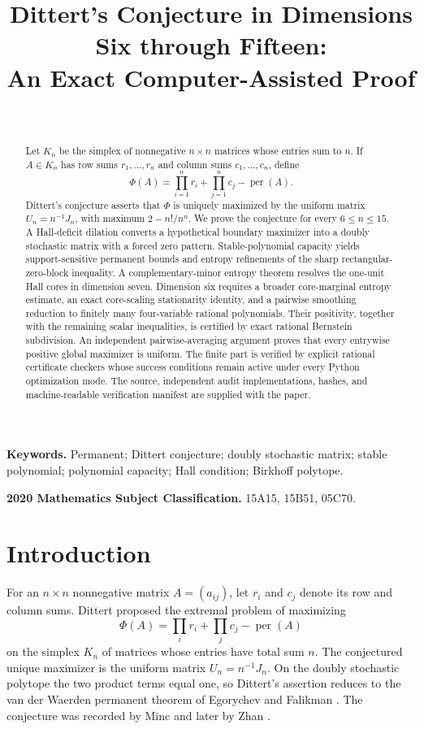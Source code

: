 \documentclass[11pt,a4paper]{article}
\title{Dittert's Conjecture in Dimensions Six through Fifteen:\\
An Exact Computer-Assisted Proof}
\author{\PaperAuthor\\[2pt]
\small\PaperORCID}
\date{\PaperVersion}
\numberwithin{equation}{section}
\theoremstyle{definition}
\newcommand{\per}{\operatorname{per}}
\newcommand{\1}{\mathbf{1}}
\begin{document}
\maketitle

\begin{abstract}
Let $K_n$ be the simplex of nonnegative $n\times n$ matrices whose entries
sum to $n$.  If $A\in K_n$ has row sums $r_1,\dots,r_n$ and column sums
$c_1,\dots,c_n$, define
\[
 \Phi(A)=\prod_{i=1}^n r_i+\prod_{j=1}^n c_j-\per(A).
\]
Dittert's conjecture asserts that $\Phi$ is uniquely maximized by the
uniform matrix $U_n=n^{-1}J_n$, with maximum $2-n!/n^n$.  We prove the
conjecture for every $6\le n\le15$.  A Hall-deficit dilation converts a
hypothetical boundary maximizer into a doubly stochastic matrix with a forced
zero pattern.  Stable-polynomial capacity yields support-sensitive permanent
bounds and entropy refinements of the sharp rectangular-zero-block
inequality.  A complementary-minor entropy theorem resolves the one-unit
Hall cores in dimension seven.  Dimension six requires a broader
core-marginal entropy estimate, an exact core-scaling stationarity identity,
and a pairwise smoothing reduction to finitely many four-variable rational
polynomials.  Their positivity, together with the remaining scalar
inequalities, is certified by exact rational Bernstein subdivision.  An
independent pairwise-averaging argument proves that every entrywise positive
global maximizer is uniform.  The finite part is verified by explicit rational certificate checkers whose
success conditions remain active under every Python optimization mode.  The
source, independent audit implementations, hashes, and machine-readable
verification manifest are supplied with the paper.
\end{abstract}

\noindent\textbf{Keywords.}
Permanent; Dittert conjecture; doubly stochastic matrix; stable polynomial; polynomial capacity; Hall condition; Birkhoff polytope.

\medskip
\noindent\textbf{2020 Mathematics Subject Classification.}
15A15, 15B51, 05C70.

\section{Introduction}

For an $n\times n$ nonnegative matrix $A=(a_{ij})$, let $r_i$ and $c_j$
denote its row and column sums.  Dittert proposed the extremal problem of
maximizing
\[
 \Phi(A)=\prod_i r_i+\prod_j c_j-\per(A)
\]
on the simplex $K_n$ of matrices whose entries have total sum $n$.  The
conjectured unique maximizer is the uniform matrix $U_n=n^{-1}J_n$.  On the
doubly stochastic polytope the two product terms equal one, so Dittert's
assertion reduces to the van der Waerden permanent theorem of Egorychev and
Falikman \cite{Egorychev1981,Falikman1981}.  The conjecture was recorded by
Minc \cite{Minc1983} and later by Zhan \cite{Zhan2007}.
\end{document}
